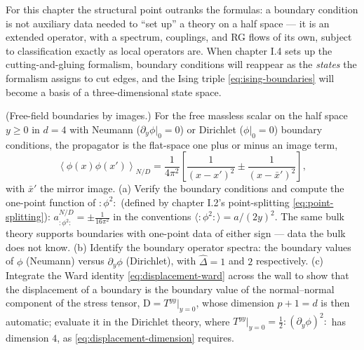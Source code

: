 For this chapter the structural point outranks the formulas: a
boundary condition is not auxiliary data needed to ``set up'' a theory
on a half space --- it is an extended operator, with a spectrum,
couplings, and RG flows of its own, subject to classification exactly
as local operators are. When chapter I.4 sets up the cutting-and-gluing
formalism, boundary conditions will reappear as the \emph{states} the
formalism assigns to cut edges, and the Ising triple
\eqref{eq:ising-boundaries} will become a basis of a three-dimensional
state space.

\begin{exercise}[classic]
\label{exr:images}
(Free-field boundaries by images.) For the free massless scalar on the
half space $y \ge 0$ in $d = 4$ with Neumann ($\partial_y \phi|_0 = 0$)
or Dirichlet ($\phi|_0 = 0$) boundary conditions, the propagator is the
flat-space one plus or minus an image term,
\begin{equation*}
\left\langle \phi(x)\phi(x') \right\rangle_{N/D}
= \frac{1}{4\pi^2}\left[\frac{1}{(x - x')^2} \pm
\frac{1}{(x - \bar x')^2}\right],
\end{equation*}
with $\bar x'$ the mirror image. (a) Verify the boundary conditions and
compute the one-point function of ${:}\phi^2{:}$ (defined by chapter
I.2's point-splitting \eqref{eq:point-splitting}): $a_{:\phi^2:}^{N/D}
= \pm \frac{1}{16\pi^2}$ in the conventions
$\langle{:}\phi^2{:}\rangle = a/(2y)^2$. The same bulk theory supports
boundaries with one-point data of either sign --- data the bulk does
not know. (b) Identify the boundary operator spectra: the boundary
values of $\phi$ (Neumann) versus $\partial_y\phi$ (Dirichlet), with
$\hat\Delta = 1$ and $2$ respectively. (c) Integrate the Ward
identity \eqref{eq:displacement-ward} across the wall to show that the
displacement of a boundary is the boundary value of the normal--normal
component of the stress tensor, $\mathrm{D} = T^{yy}|_{y=0}$, whose
dimension $p + 1 = d$ is then automatic; evaluate it in the Dirichlet
theory, where $T^{yy}|_{y=0} = \frac12 {:}(\partial_y\phi)^2{:}$ has
dimension $4$, as \eqref{eq:displacement-dimension} requires.
\end{exercise}

